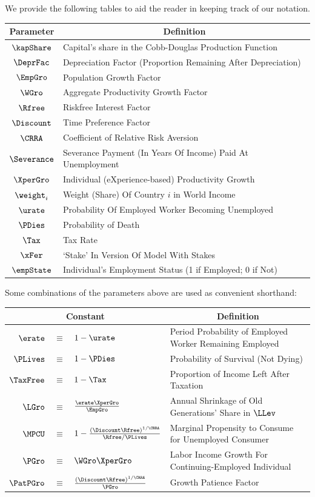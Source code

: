 \documentclass[titlepage]{\econtex}\newcommand{\texname}{cjSOE}
\begin{document}
We provide the following tables to aid the reader in keeping track of our notation.
\begin{center}
\begin{tabular}{|c|l|} \hline
 Parameter & \multicolumn{1}{|c|}{Definition}  \\ \hline
 $\kapShare$ & Capital's share in the Cobb-Douglas Production Function\\
 $\DeprFac$ & Depreciation Factor (Proportion Remaining After Depreciation)\\
 $\EmpGro$ & Population Growth Factor \\
 $\WGro$ & Aggregate Productivity Growth Factor\\
 $\Rfree$ & Riskfree Interest Factor \\
 $\Discount$ & Time Preference Factor \\
 $\CRRA$ & Coefficient of Relative Risk Aversion \\
 $\Severance$ & Severance Payment (In Years Of Income) Paid At Unemployment \\
 $\XperGro$ & Individual (eXperience-based) Productivity Growth \\
 $\weight_{i}$ & Weight (Share) Of Country $i$ in World Income \\
 $\urate$ & Probability Of Employed Worker Becoming Unemployed \\
 $\PDies $ & Probability of Death   \\
 $\Tax$ & Tax Rate \\
 $\xFer$ & `Stake' In Version Of Model With Stakes \\
 $\empState$ & Individual's Employment Status (1 if Employed; 0 if Not) \\
\hline
\end{tabular}
\end{center}

Some combinations of the parameters above are used as convenient shorthand:
\begin{center}
\begin{tabular}{|rcl|l|} \hline
 \multicolumn{3}{|c|}{Constant} & \multicolumn{1}{c|}{Definition}  \\ \hline
 $\erate$ & $\equiv$ & $1-\urate$ & Period Probability of Employed Worker Remaining Employed \\
 $\PLives$ & $\equiv$ & $1-\PDies$ & Probability of Survival (Not Dying) \\
 $\TaxFree$ & $\equiv$ & $1-\Tax$ & Proportion of Income Left After Taxation \\
 $\LGro$ & $\equiv$ & $\frac{\erate\XperGro}{\EmpGro}$ & Annual Shrinkage of Old Generations' Share in $\LLev$ \\
 $\MPCU$ & $\equiv$ & $1- \frac{(\Discount \Rfree)^{1/\CRRA}}{\Rfree/\PLives}$ & Marginal Propensity to Consume for Unemployed Consumer \\
 $\PGro$ & $\equiv$ & $\WGro \XperGro$ & Labor Income Growth For Continuing-Employed Individual \\
 $\PatPGro$ & $\equiv$ & $\frac{(\Discount \Rfree)^{1/\CRRA}}{\PGro}$ & Growth Patience Factor \\
\hline
\end{tabular}
\end{center}
\end{document}
